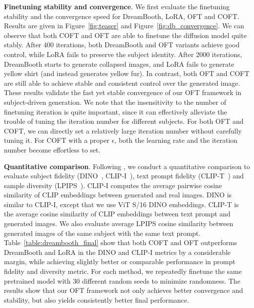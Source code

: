 \textbf{Finetuning stability and convergence}. We first evaluate the finetuning stability and the convergence speed for DreamBooth, LoRA, OFT and COFT. Results are given in Figure~\ref{fig:teaser} and Figure~\ref{fig:db_convergence}. We can observe that both COFT and OFT are able to finetune the diffusion model quite stably. After 400 iterations, both DreamBooth and OFT variants achieve good control, while LoRA fails to preserve the subject identity. After 2000 iterations, DreamBooth starts to generate collapsed images, and LoRA fails to generate yellow shirt (and instead generates yellow fur). In contrast, both OFT and COFT are still able to achieve stable and consistent control over the generated image. These results validate the fast yet stable convergence of our OFT framework in subject-driven generation. We note that the insensitivity to the number of finetuning iteration is quite important, since it can effectively alleviate the trouble of tuning the iteration number for different subjects. For both OFT and COFT, we can directly set a relatively large iteration number without carefully tuning it. For COFT with a proper $\epsilon$, both the learning rate and the iteration number become effortless to set.

\textbf{Quantitative comparison}. Following \cite{ruiz2023dreambooth}, we conduct a quantitative comparison to evaluate subject fidelity (DINO~\cite{caron2021emerging}, CLIP-I~\cite{radford2021learning}), text prompt fidelity (CLIP-T~\cite{radford2021learning}) and sample diversity (LPIPS~\cite{zhang2018unreasonable}). CLIP-I computes the average pairwise cosine similarity of CLIP embeddings between generated and real images. DINO is similar to CLIP-I, except that we use ViT S/16 DINO embeddings. CLIP-T is the average cosine similarity of CLIP embeddings between text prompt and generated images. We also evaluate average LPIPS cosine similarity between generated images of the same subject with the same text prompt. Table~\ref{table:dreambooth_final} show that both COFT and OFT outperforms DreamBooth and LoRA in the DINO and CLIP-I metrics by a considerable margin, while achieving slightly better or comparable performance in prompt fidelity and diversity metric. For each method, we repeatedly finetune the same pretrained model with 30 different random seeds to minimize randomness. The results show that our OFT framework not only achieves better convergence and stability, but also yields consistently better final performance.

